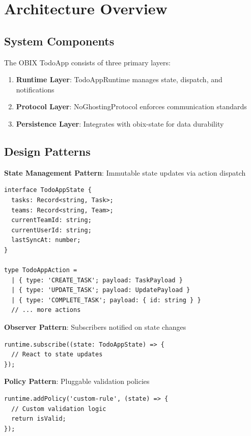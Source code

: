 \documentclass[12pt,a4paper]{article}
\begin{document}
\section{Architecture Overview}

\subsection{System Components}

The OBIX TodoApp consists of three primary layers:

\begin{enumerate}
  \item \textbf{Runtime Layer}: TodoAppRuntime manages state, dispatch, and notifications
  \item \textbf{Protocol Layer}: NoGhostingProtocol enforces communication standards
  \item \textbf{Persistence Layer}: Integrates with obix-state for data durability
\end{enumerate}

\subsection{Design Patterns}

\textbf{State Management Pattern}: Immutable state updates via action dispatch

\begin{lstlisting}
interface TodoAppState {
  tasks: Record<string, Task>;
  teams: Record<string, Team>;
  currentTeamId: string;
  currentUserId: string;
  lastSyncAt: number;
}

type TodoAppAction =
  | { type: 'CREATE_TASK'; payload: TaskPayload }
  | { type: 'UPDATE_TASK'; payload: UpdatePayload }
  | { type: 'COMPLETE_TASK'; payload: { id: string } }
  // ... more actions
\end{lstlisting}

\textbf{Observer Pattern}: Subscribers notified on state changes

\begin{lstlisting}
runtime.subscribe((state: TodoAppState) => {
  // React to state updates
});
\end{lstlisting}

\textbf{Policy Pattern}: Pluggable validation policies

\begin{lstlisting}
runtime.addPolicy('custom-rule', (state) => {
  // Custom validation logic
  return isValid;
});
\end{lstlisting}
\end{document}
